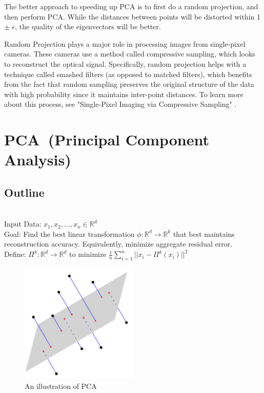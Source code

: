 The better approach to speeding up PCA is to first do a random
projection, and then perform PCA. While the distances between points
will be distorted within 1 $\pm$ $\epsilon$, the quality of the
eigenvectors will be better.

Random Projection plays a major role in processing images from
single-pixel cameras. These cameras use a method called compressive
sampling, which looks to reconstruct the optical signal. 
Specifically, random projection helps with a technique called 
smashed filters (as opposed to matched filters), which benefits from
the fact that random sampling preserves the original structure of the
data with high probability since it maintains inter-point distances. 
To learn more about this process, see "Single-Pixel Imaging via 
Compressive Sampling" \cite{duarte}.

\section{PCA~(Principal Component Analysis)}
\subsection{Outline}\\
Input Data: $x_1,x_2,...,x_n \in \mathbb{R}^d$\\

\noindent Goal: Find the best linear transformation $\phi:
\mathbb{R}^d \rightarrow \mathbb{R}^k$ that best maintains
reconstruction accuracy. Equivalently, minimize aggregate residual
error.\\ 

\noindent Define: $\Pi^k: \mathbb{R}^d \rightarrow \mathbb{R}^d$ to
minimize $\frac{1}{n} \sum_{i=1}^n ||x_i - \Pi^k (x_i)||^2$\\

\begin{figure}[h!]
\begin{center}
\includegraphics[width=0.5\textwidth]{chapter_6/files/projections.jpg}
\caption{An illustration of PCA}
\end{center}
\end{figure}
